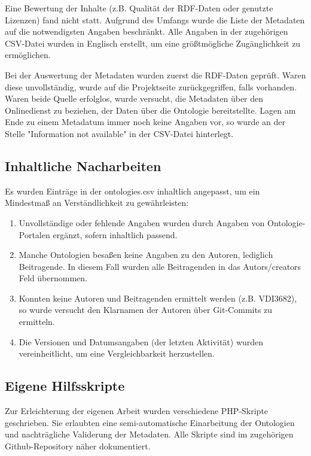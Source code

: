 \documentclass{article}
\begin{document}
Eine Bewertung der Inhalte (z.B. Qualität der RDF-Daten oder genutzte Lizenzen) fand nicht statt.
Aufgrund des Umfangs wurde die Liste der Metadaten auf die notwendigsten Angaben beschränkt.
Alle Angaben in der zugehörigen CSV-Datei wurden in Englisch erstellt, um eine größtmögliche Zugänglichkeit zu ermöglichen.

Bei der Auswertung der Metadaten wurden zuerst die RDF-Daten geprüft. Waren diese unvollständig, wurde auf die Projektseite zurückgegriffen, falls vorhanden.
Waren beide Quelle erfolglos, wurde versucht, die Metadaten über den Onlinedienst zu beziehen, der Daten über die Ontologie bereitstellte.
Lagen am Ende zu einem Metadatum immer noch keine Angaben vor, so wurde an der Stelle "Information not available" in der CSV-Datei hinterlegt.

\subsection{Inhaltliche Nacharbeiten}

Es wurden Einträge in der ontologies.csv inhaltlich angepasst, um ein Mindestmaß an Verständlichkeit zu gewährleisten:

\begin{enumerate}
    \item Unvollständige oder fehlende Angaben wurden durch Angaben von Ontologie-Portalen ergänzt, sofern inhaltlich passend.
    \item Manche Ontologien besaßen keine Angaben zu den Autoren, lediglich Beitragende. In diesem Fall wurden alle Beitragenden in das Autors/creators Feld übernommen.
    \item Konnten keine Autoren und Beitragenden ermittelt werden (z.B. VDI3682), so wurde versucht den Klarnamen der Autoren über Git-Commits zu ermitteln.
    \item Die Versionen und Datumsangaben (der letzten Aktivität) wurden vereinheitlicht, um eine Vergleichbarkeit herzustellen.
\end{enumerate}

\subsection{Eigene Hilfsskripte}

Zur Erleichterung der eigenen Arbeit wurden verschiedene PHP-Skripte geschrieben.
Sie erlaubten eine semi-automatische Einarbeitung der Ontologien und nachträgliche Validerung der Metadaten.
Alle Skripte sind im zugehörigen Github-Repository näher dokumentiert.
\end{document}

